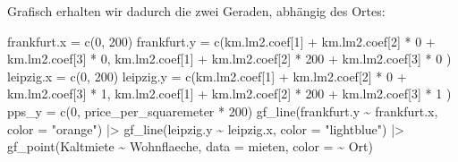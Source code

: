 \documentclass[
  a4paper,
  DIV=11]{scrartcl}
\newenvironment{Shaded}{\begin{snugshade}}{\end{snugshade}}
\newcommand{\AttributeTok}[1]{\textcolor[rgb]{0.40,0.45,0.13}{#1}}
\newcommand{\DecValTok}[1]{\textcolor[rgb]{0.68,0.00,0.00}{#1}}
\newcommand{\FunctionTok}[1]{\textcolor[rgb]{0.28,0.35,0.67}{#1}}
\newcommand{\NormalTok}[1]{\textcolor[rgb]{0.00,0.23,0.31}{#1}}
\newcommand{\OtherTok}[1]{\textcolor[rgb]{0.00,0.23,0.31}{#1}}
\newcommand{\SpecialCharTok}[1]{\textcolor[rgb]{0.37,0.37,0.37}{#1}}
\newcommand{\StringTok}[1]{\textcolor[rgb]{0.13,0.47,0.30}{#1}}
\begin{document}
Grafisch erhalten wir dadurch die zwei Geraden, abhängig des Ortes:

\begin{Shaded}
\begin{Highlighting}[]
\NormalTok{frankfurt.x }\OtherTok{=} \FunctionTok{c}\NormalTok{(}\DecValTok{0}\NormalTok{, }\DecValTok{200}\NormalTok{)}
\NormalTok{frankfurt.y }\OtherTok{=} \FunctionTok{c}\NormalTok{(km.lm2.coef[}\DecValTok{1}\NormalTok{] }\SpecialCharTok{+}\NormalTok{ km.lm2.coef[}\DecValTok{2}\NormalTok{] }\SpecialCharTok{*} \DecValTok{0} \SpecialCharTok{+}\NormalTok{ km.lm2.coef[}\DecValTok{3}\NormalTok{] }\SpecialCharTok{*} \DecValTok{0}\NormalTok{, }
\NormalTok{                km.lm2.coef[}\DecValTok{1}\NormalTok{] }\SpecialCharTok{+}\NormalTok{ km.lm2.coef[}\DecValTok{2}\NormalTok{] }\SpecialCharTok{*} \DecValTok{200} \SpecialCharTok{+}\NormalTok{ km.lm2.coef[}\DecValTok{3}\NormalTok{] }\SpecialCharTok{*} \DecValTok{0}\NormalTok{ )}
\NormalTok{leipzig.x }\OtherTok{=} \FunctionTok{c}\NormalTok{(}\DecValTok{0}\NormalTok{, }\DecValTok{200}\NormalTok{)}
\NormalTok{leipzig.y }\OtherTok{=} \FunctionTok{c}\NormalTok{(km.lm2.coef[}\DecValTok{1}\NormalTok{] }\SpecialCharTok{+}\NormalTok{ km.lm2.coef[}\DecValTok{2}\NormalTok{] }\SpecialCharTok{*} \DecValTok{0} \SpecialCharTok{+}\NormalTok{ km.lm2.coef[}\DecValTok{3}\NormalTok{] }\SpecialCharTok{*} \DecValTok{1}\NormalTok{, }
\NormalTok{              km.lm2.coef[}\DecValTok{1}\NormalTok{] }\SpecialCharTok{+}\NormalTok{ km.lm2.coef[}\DecValTok{2}\NormalTok{] }\SpecialCharTok{*} \DecValTok{200} \SpecialCharTok{+}\NormalTok{ km.lm2.coef[}\DecValTok{3}\NormalTok{] }\SpecialCharTok{*} \DecValTok{1}\NormalTok{ )}
\NormalTok{pps\_y }\OtherTok{=} \FunctionTok{c}\NormalTok{(}\DecValTok{0}\NormalTok{, price\_per\_squaremeter }\SpecialCharTok{*} \DecValTok{200}\NormalTok{)}
\FunctionTok{gf\_line}\NormalTok{(frankfurt.y }\SpecialCharTok{\textasciitilde{}}\NormalTok{ frankfurt.x, }\AttributeTok{color =} \StringTok{"orange"}\NormalTok{) }\SpecialCharTok{|\textgreater{}} 
  \FunctionTok{gf\_line}\NormalTok{(leipzig.y }\SpecialCharTok{\textasciitilde{}}\NormalTok{ leipzig.x, }\AttributeTok{color =} \StringTok{"lightblue"}\NormalTok{) }\SpecialCharTok{|\textgreater{}}
  \FunctionTok{gf\_point}\NormalTok{(Kaltmiete }\SpecialCharTok{\textasciitilde{}}\NormalTok{ Wohnflaeche, }\AttributeTok{data =}\NormalTok{ mieten, }\AttributeTok{color =} \SpecialCharTok{\textasciitilde{}}\NormalTok{ Ort)}
\end{Highlighting}
\end{Shaded}
\end{document}
